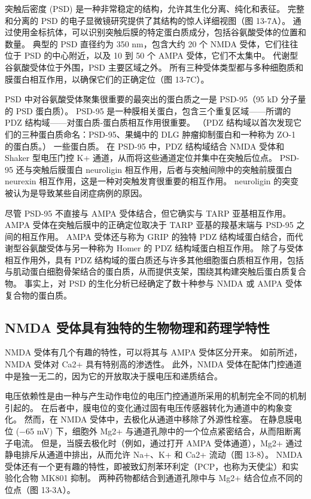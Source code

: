 突触后密度 (PSD) 是一种非常稳定的结构，允许其生化分离、纯化和表征。 
完整和分离的 PSD 的电子显微镜研究提供了其结构的惊人详细视图（图 13-7A）。 
通过使用金标抗体，可以识别突触后膜的特定蛋白质成分，包括谷氨酸受体的位置和数量。 
典型的 PSD 直径约为 350 nm，包含大约 20 个 NMDA 受体，它们往往位于 PSD 的中心附近，以及 10 到 50 个 AMPA 受体，它们不太集中。 
代谢型谷氨酸受体位于外围，PSD 主要区域之外。
所有三种受体类型都与多种细胞质和膜蛋白相互作用，以确保它们的正确定位（图 13-7C）。


PSD 中对谷氨酸受体聚集很重要的最突出的蛋白质之一是 PSD-95（95 kD 分子量的 PSD 蛋白质）。 
PSD-95 是一种膜相关蛋白，包含三个重复区域——所谓的 PDZ 结构域——对蛋白质-蛋白质相互作用很重要。 （PDZ 结构域以首次发现它们的三种蛋白质命名：PSD-95、果蝇中的 DLG 肿瘤抑制蛋白和一种称为 ZO-1 的蛋白质。） 一些蛋白质。 
在 PSD-95 中，PDZ 结构域结合 NMDA 受体和 Shaker 型电压门控 K+ 通道，从而将这些通道定位并集中在突触后位点。 
PSD-95 还与突触后膜蛋白 neuroligin 相互作用，后者与突触间隙中的突触前膜蛋白 neurexin 相互作用，这是一种对突触发育很重要的相互作用。 neuroligin 的突变被认为是导致某些自闭症病例的原因。


尽管 PSD-95 不直接与 AMPA 受体结合，但它确实与 TARP 亚基相互作用。 
AMPA 受体在突触后膜中的正确定位取决于 TARP 亚基的羧基末端与 PSD-95 之间的相互作用。 
AMPA 受体还与称为 GRIP 的独特 PDZ 结构域蛋白结合，而代谢型谷氨酸受体与另一种称为 Homer 的 PDZ 结构域蛋白相互作用。 
除了与受体相互作用外，具有 PDZ 结构域的蛋白质还与许多其他细胞蛋白质相互作用，包括与肌动蛋白细胞骨架结合的蛋白质，从而提供支架，围绕其构建突触后蛋白质复合物。 
事实上，对 PSD 的生化分析已经确定了数十种参与 NMDA 或 AMPA 受体复合物的蛋白质。


\subsection{NMDA 受体具有独特的生物物理和药理学特性}

NMDA 受体有几个有趣的特性，可以将其与 AMPA 受体区分开来。 
如前所述，NMDA 受体对 Ca2+ 具有特别高的渗透性。 
此外，NMDA 受体在配体门控通道中是独一无二的，因为它的开放取决于膜电压和递质结合。


电压依赖性是由一种与产生动作电位的电压门控通道所采用的机制完全不同的机制引起的。 
在后者中，膜电位的变化通过固有电压传感器转化为通道中的构象变化。
然而，在 NMDA 受体中，去极化从通道中移除了外源性栓塞。 
在静息膜电位 (−65 mV) 下，细胞外 Mg2+ 与通道孔隙中的一个位点紧密结合，从而阻断离子电流。 
但是，当膜去极化时（例如，通过打开 AMPA 受体通道），Mg2+ 通过静电排斥从通道中排出，从而允许 Na+、K+ 和 Ca2+ 流动（图 13-8）。 
NMDA 受体还有一个更有趣的特性，即被致幻剂苯环利定（PCP，也称为天使尘）和实验化合物 MK801 抑制。 
两种药物都结合到通道孔隙中与 Mg2+ 结合位点不同的位点（图 13-3A）。


